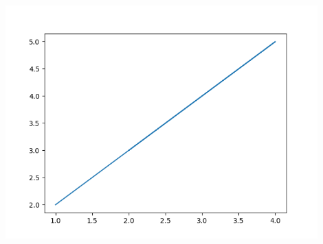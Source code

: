 \documentclass[12pt, letterpaper]{article}
\begin{document}
\includegraphics[width=0.9\textwidth]{myplot}
\end{document}
